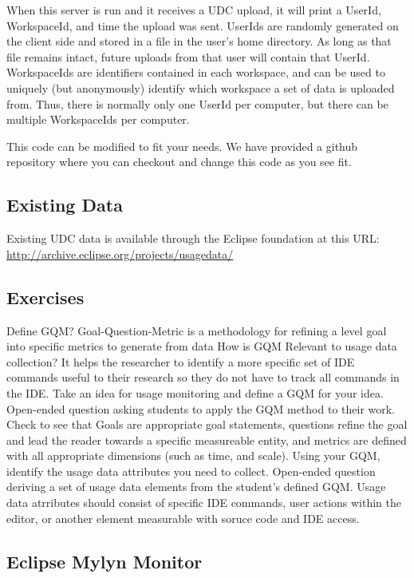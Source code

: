 \noindent
When this server is run and it receives a UDC upload, 
it will print a UserId, WorkspaceId, and time the upload was sent.
UserIds are randomly generated on the client side and stored in a file in
the user's home directory. 
As long as that file remains intact, future uploads from that user will
contain that UserId.
WorkspaceIds are identifiers contained in each workspace, and can be 
used to uniquely (but anonymously) identify which 
workspace a set of data is uploaded from.
Thus, there is normally only one UserId per computer, but there can
be multiple WorkspaceIds per computer.

This code can be modified to fit your needs.
We have provided a github repository where you can checkout 
and change this code as you see fit.



\subsection{Existing Data}

Existing UDC data is available through the Eclipse foundation at this URL:
\url{http://archive.eclipse.org/projects/usagedata/}

\subsection{Exercises}

\begin{ExerciseList}
 \Exercise[type={long}, difficulty={0}]Define GQM? 
  \Answer Goal-Question-Metric is a methodology for refining a level goal into specific metrics to generate from data
 \Exercise[ type={long}, difficulty={1}]How is GQM Relevant to usage data collection? 
  \Answer It helps the researcher to identify a more specific set of IDE commands useful to their research so they do not have to track all commands in the IDE.
  \Exercise[ type={long}, difficulty={2}]Take an idea for usage monitoring and define a GQM for your idea. 
  \Answer Open-ended question asking students to apply the GQM method to their work.  Check to see that Goals are appropriate goal statements, questions refine the goal and lead the reader towards a specific measureable entity, and metrics are defined with all appropriate dimensions (such as time, and scale).
  \Exercise[ type={long}, difficulty={2}]Using your GQM, identify the usage data attributes you need to collect. 
  \Answer Open-ended question deriving a set of usage data elements from the student's defined GQM.  Usage data atrributes should consist of specific IDE commands, user actions within the editor, or another element measurable with soruce code and IDE access. 

\end{ExerciseList}


\subsection{Eclipse Mylyn Monitor}
